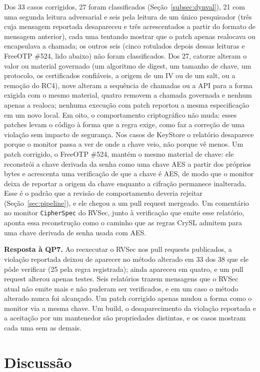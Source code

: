 \documentclass[conference]{IEEEtran}
\newcommand{\researchq}[1]{\textbf{QP#1}}
\begin{document}
Dos 33 casos corrigidos, 27 foram classificados (Seção~\ref{subsec:dynval}),
21 com uma segunda leitura adversarial e seis pela leitura de um único
pesquisador (três cuja mensagem reportada desapareceu e três acrescentados a
partir do formato de mensagem anterior), cada uma tentando mostrar que o patch
apenas realocava ou encapsulava a chamada; os outros seis (cinco rotulados depois dessas leituras e FreeOTP \#524,
lido abaixo) não foram classificados. Dos 27, catorze alteram o
valor ou material governado (um algoritmo de digest, um tamanho de chave, um protocolo, os certificados
confiáveis, a origem de um IV ou de um salt, ou a remoção do RC4), nove alteram a sequência de chamadas ou a API para a
forma exigida com o mesmo material, quatro removem a chamada governada e nenhum
apenas a realoca; nenhuma execução com patch reportou a mesma especificação em um novo
local. Em oito, o comportamento criptográfico não muda: esses patches levam o código à
forma que a regra exige, como faz a correção de uma violação sem impacto
de segurança. Nos casos de KeyStore o relatório desaparece porque o monitor
passa a ver de onde a chave veio, não porque vê menos. Um patch
corrigido, o FreeOTP \#524, mantém o mesmo material de chave: ele reconstrói a
chave derivada da senha como uma chave AES a partir dos próprios bytes e acrescenta uma verificação de que
a chave é AES, de modo que o monitor deixa de reportar a origem da chave enquanto a
cifração permanece inalterada. Esse é o padrão que a revisão de comportamento deveria
rejeitar (Seção~\ref{sec:pipeline}), e ele chegou a um pull request mergeado.
Um comentário no monitor \texttt{CipherSpec} do RVSec, junto à verificação que
emite esse relatório, aponta essa reconstrução como o caminho que as regras CrySL
admitem para uma chave derivada de senha usada com AES.

\textbf{Resposta à \researchq{7}.} Ao reexecutar o RVSec nos pull requests
publicados, a violação reportada deixou de aparecer no método alterado em
33 dos 38 que ele pôde verificar (25 pela regra registrada); ainda apareceu
em quatro, e um pull request
alterou apenas testes. Seis relatórios trazem mensagens que o RVSec atual não
emite mais e não puderam ser verificados, e em um caso o método alterado nunca foi
alcançado. Um patch corrigido apenas mudou a forma como o monitor via a mesma chave. Um build, o desaparecimento da violação reportada e a
aceitação por um mantenedor são propriedades distintas, e os casos mostram cada uma
sem as demais.

\section{Discussão}
\label{sec:discussion}
\end{document}
